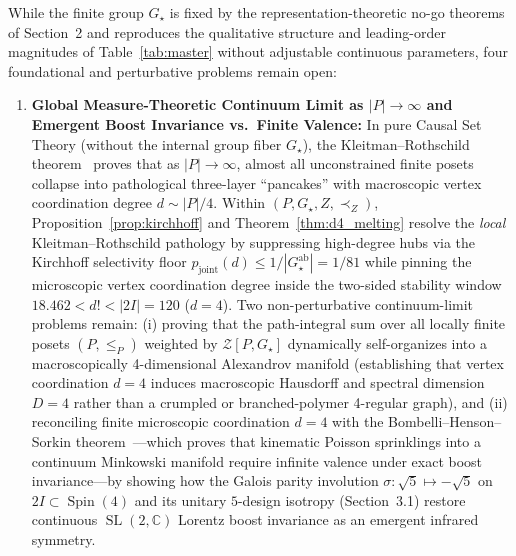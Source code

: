 \documentclass[11pt,a4paper]{article}
\theoremstyle{definition}
\theoremstyle{remark}
\newcommand{\C}{\mathbb{C}}
\newcommand{\Spin}{\operatorname{Spin}}
\newcommand{\SL}{\operatorname{SL}}
\newcommand{\Gstar}{G_\star}
\begin{document}
While the finite group $\Gstar$ is fixed by the representation-theoretic no-go theorems of Section~2 and reproduces the qualitative structure and leading-order magnitudes of Table~\ref{tab:master} without adjustable continuous parameters, four foundational and perturbative problems remain open:

\begin{enumerate}
    \item \textbf{Global Measure-Theoretic Continuum Limit as $|P| \to \infty$ and Emergent Boost Invariance vs.\ Finite Valence:}
    In pure Causal Set Theory (without the internal group fiber $\Gstar$), the Kleitman--Rothschild theorem~\cite{KleitmanRothschild1975} proves that as $|P| \to \infty$, almost all unconstrained finite posets collapse into pathological three-layer ``pancakes'' with macroscopic vertex coordination degree $d \sim |P|/4$. Within $(P, \Gstar, Z, \prec_Z)$, Proposition~\ref{prop:kirchhoff} and Theorem~\ref{thm:d4_melting} resolve the \emph{local} Kleitman--Rothschild pathology by suppressing high-degree hubs via the Kirchhoff selectivity floor $p_{\mathrm{joint}}(d) \le 1/|\Gstar^{\mathrm{ab}}| = 1/81$ while pinning the microscopic vertex coordination degree inside the two-sided stability window $18.462 < d! < |2I| = 120$ ($d = 4$). Two non-perturbative continuum-limit problems remain: (i) proving that the path-integral sum over all locally finite posets $(P, \le_P)$ weighted by $\mathcal{Z}[P, \Gstar]$ dynamically self-organizes into a macroscopically 4-dimensional Alexandrov manifold (establishing that vertex coordination $d = 4$ induces macroscopic Hausdorff and spectral dimension $D = 4$ rather than a crumpled or branched-polymer 4-regular graph), and (ii) reconciling finite microscopic coordination $d = 4$ with the Bombelli--Henson--Sorkin theorem~\cite{BombelliHensonSorkin2009}---which proves that kinematic Poisson sprinklings into a continuum Minkowski manifold require infinite valence under exact boost invariance---by showing how the Galois parity involution $\sigma : \sqrt{5} \mapsto -\sqrt{5}$ on $2I \subset \Spin(4)$ and its unitary $5$-design isotropy (Section~3.1) restore continuous $\SL(2,\C)$ Lorentz boost invariance as an emergent infrared symmetry.


\end{enumerate}
\end{document}

